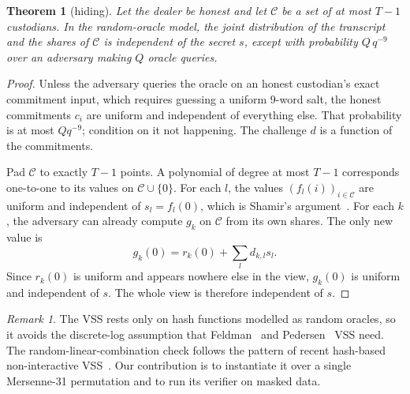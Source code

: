 \documentclass[10pt,a4paper]{article}
\newtheorem{theorem}{Theorem}
\theoremstyle{definition}
\theoremstyle{remark}
\newtheorem{remark}{Remark}
\begin{document}
\begin{theorem}[hiding]\label{thm:hide}
Let the dealer be honest and let $\mathcal{C}$ be a set of at most $T-1$ custodians. In the random-oracle model, the joint distribution of the transcript and the shares of $\mathcal{C}$ is independent of the secret $s$, except with probability $Q\,q^{-9}$ over an adversary making $Q$ oracle queries.
\end{theorem}
\begin{proof}
Unless the adversary queries the oracle on an honest custodian's exact commitment input, which requires guessing a uniform 9-word salt, the honest commitments $c_i$ are uniform and independent of everything else. That probability is at most $Q q^{-9}$; condition on it not happening. The challenge $d$ is a function of the commitments.

Pad $\mathcal{C}$ to exactly $T-1$ points. A polynomial of degree at most $T-1$ corresponds one-to-one to its values on $\mathcal{C} \cup \{0\}$. For each $l$, the values $(f_l(i))_{i\in \mathcal{C}}$ are uniform and independent of $s_l = f_l(0)$, which is Shamir's argument~\cite{shamir}. For each $k$, the adversary can already compute $g_k$ on $\mathcal{C}$ from its own shares. The only new value is
\[
  g_k(0) = r_k(0) + \textstyle\sum_l d_{k,l} s_l .
\]
Since $r_k(0)$ is uniform and appears nowhere else in the view, $g_k(0)$ is uniform and independent of $s$. The whole view is therefore independent of $s$.
\end{proof}

\begin{remark}
The VSS rests only on hash functions modelled as random oracles, so it avoids the discrete-log assumption that Feldman~\cite{feldman} and Pedersen~\cite{pedersen} VSS need. The random-linear-combination check follows the pattern of recent hash-based non-interactive VSS~\cite{abcp23}. Our contribution is to instantiate it over a single Mersenne-31 permutation and to run its verifier on masked data.
\end{remark}
\end{document}
